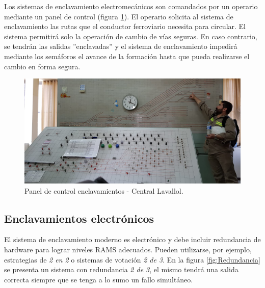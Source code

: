 			\vspace{7cm}
			
			Los sistemas de enclavamiento electromecánicos son comandados por un operario mediante un panel de control (figura \ref{fig:Electromecanico}). El operario solicita al sistema de enclavamiento las rutas que el conductor ferroviario necesita para circular. El sistema permitirá solo la operación de cambio de vías seguras. En caso contrario, se tendrán las salidas ''enclavadas'' y el sistema de enclavamiento impedirá mediante los semáforos el avance de la formación hasta que pueda realizarse el cambio en forma segura.
		
			\begin{figure}[h!]
				\centering
				\includegraphics[scale=.27]{./Figures/Electromecanico}
				\caption{Panel de control enclavamientos - Central Lavallol.}
				\label{fig:Electromecanico}
			\end{figure}
		
			
		
		\subsection{Enclavamientos electrónicos}
		\label{sec:Redundancia}	
			
			El sistema de enclavamiento moderno es electrónico y debe incluir redundancia de hardware para lograr niveles RAMS adecuados. Pueden utilizarse, por ejemplo, estrategias de \emph{2 en 2} o sistemas de votación \emph{2 de 3}. En la figura \ref{fig:Redundancia} se presenta un sistema con redundancia \emph{2 de 3}, el mismo tendrá una salida correcta siempre que se tenga a lo sumo un fallo simultáneo\citep{REDUNDANCIA}. 
			
